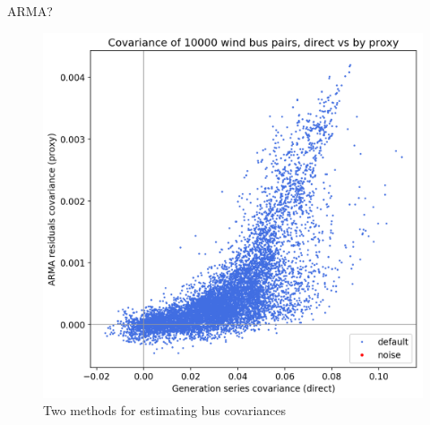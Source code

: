 \documentclass[10pt]{beamer}
\begin{document}
{
\begin{frame}[plain]
\end{frame}
}

\begin{frame}{ARMA?}
    \begin{figure}
        \centering
        \includegraphics[height=.65\paperheight]{img/cov_direct_vs_proxy_wind.png}
        \caption{Two methods for estimating bus covariances}
    \end{figure}
\end{frame}
\end{document}
